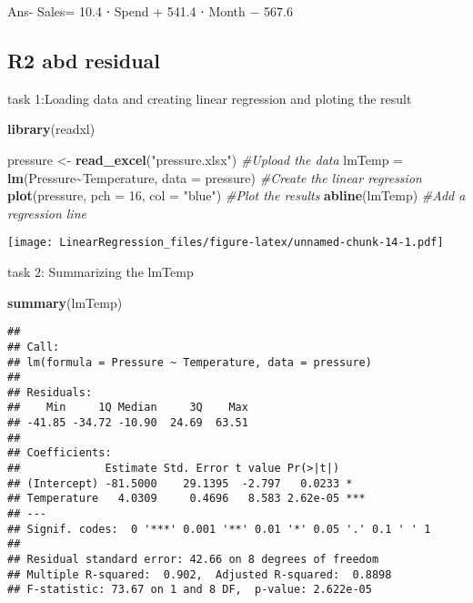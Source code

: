 \documentclass[
]{article}
\newenvironment{Shaded}{\begin{snugshade}}{\end{snugshade}}
\newcommand{\AttributeTok}[1]{\textcolor[rgb]{0.13,0.29,0.53}{#1}}
\newcommand{\CommentTok}[1]{\textcolor[rgb]{0.56,0.35,0.01}{\textit{#1}}}
\newcommand{\DecValTok}[1]{\textcolor[rgb]{0.00,0.00,0.81}{#1}}
\newcommand{\FunctionTok}[1]{\textcolor[rgb]{0.13,0.29,0.53}{\textbf{#1}}}
\newcommand{\NormalTok}[1]{#1}
\newcommand{\OtherTok}[1]{\textcolor[rgb]{0.56,0.35,0.01}{#1}}
\newcommand{\SpecialCharTok}[1]{\textcolor[rgb]{0.81,0.36,0.00}{\textbf{#1}}}
\newcommand{\StringTok}[1]{\textcolor[rgb]{0.31,0.60,0.02}{#1}}
\begin{document}
Ans- Sales= 10.4 ⋅ Spend + 541.4 ⋅ Month − 567.6

\hypertarget{r2-abd-residual}{%
\subsection{R2 abd residual}\label{r2-abd-residual}}

task 1:Loading data and creating linear regression and ploting the
result

\begin{Shaded}
\begin{Highlighting}[]
\FunctionTok{library}\NormalTok{(readxl)}

\NormalTok{pressure }\OtherTok{\textless{}{-}} \FunctionTok{read\_excel}\NormalTok{(}\StringTok{"pressure.xlsx"}\NormalTok{) }\CommentTok{\#Upload the data }
\NormalTok{lmTemp }\OtherTok{=} \FunctionTok{lm}\NormalTok{(Pressure}\SpecialCharTok{\textasciitilde{}}\NormalTok{Temperature, }\AttributeTok{data =}\NormalTok{ pressure) }\CommentTok{\#Create the linear regression  }
\FunctionTok{plot}\NormalTok{(pressure, }\AttributeTok{pch =} \DecValTok{16}\NormalTok{, }\AttributeTok{col =} \StringTok{"blue"}\NormalTok{) }\CommentTok{\#Plot the results }
\FunctionTok{abline}\NormalTok{(lmTemp) }\CommentTok{\#Add a regression line }
\end{Highlighting}
\end{Shaded}

\texttt{[image: LinearRegression\_files/figure-latex/unnamed-chunk-14-1.pdf]}

task 2: Summarizing the lmTemp

\begin{Shaded}
\begin{Highlighting}[]
\FunctionTok{summary}\NormalTok{(lmTemp) }
\end{Highlighting}
\end{Shaded}

\begin{verbatim}
## 
## Call:
## lm(formula = Pressure ~ Temperature, data = pressure)
## 
## Residuals:
##    Min     1Q Median     3Q    Max 
## -41.85 -34.72 -10.90  24.69  63.51 
## 
## Coefficients:
##             Estimate Std. Error t value Pr(>|t|)    
## (Intercept) -81.5000    29.1395  -2.797   0.0233 *  
## Temperature   4.0309     0.4696   8.583 2.62e-05 ***
## ---
## Signif. codes:  0 '***' 0.001 '**' 0.01 '*' 0.05 '.' 0.1 ' ' 1
## 
## Residual standard error: 42.66 on 8 degrees of freedom
## Multiple R-squared:  0.902,  Adjusted R-squared:  0.8898 
## F-statistic: 73.67 on 1 and 8 DF,  p-value: 2.622e-05
\end{verbatim}
\end{document}
